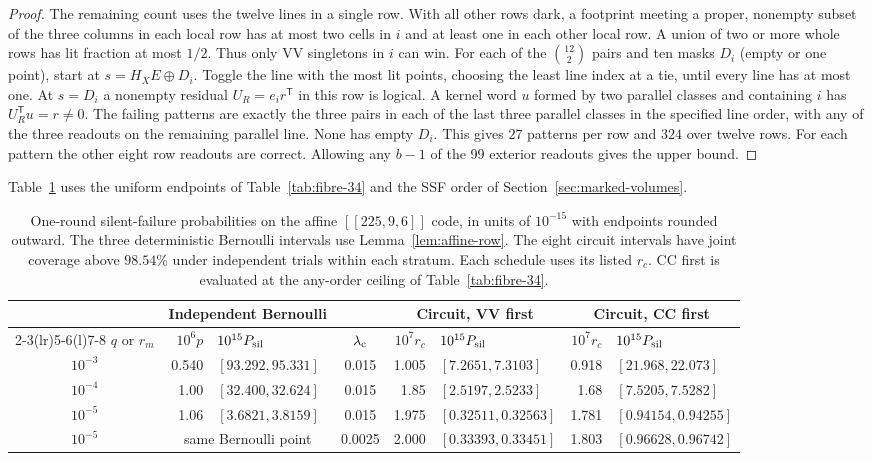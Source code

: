 \documentclass[10pt,twocolumn]{article}
\theoremstyle{definition}
\begin{document}
\begin{proof}
The remaining count uses the twelve lines in a single row. With all
other rows dark, a footprint meeting a proper, nonempty subset of
the three columns in each local row has at most two cells in $i$
and at least one in each other local row. A union of two or more
whole rows has lit fraction at most $1/2$. Thus only VV singletons
in $i$ can win. For each of the $\binom{12}{2}$ pairs and ten masks
$D_i$ (empty or one point), start at $s=H_XE\oplus D_i$.
Toggle the line with the most lit points, choosing the least line
index at a tie, until every line has at most one. At $s=D_i$ a
nonempty residual $U_R=e_i r^{\mathsf T}$ in this row is logical.
A kernel word $u$ formed by two parallel classes and containing $i$
has $U_R^{\mathsf T}u=r\ne0$. The failing patterns are exactly the
three pairs in each of the last three parallel classes in the specified
line order, with any of the three readouts on the remaining parallel
line. None has empty $D_i$. This gives $27$ patterns per row and $324$
over twelve rows. For each pattern the other eight row readouts
are correct. Allowing any $b-1$ of the 99 exterior readouts gives
the upper bound.
\end{proof}

Table~\ref{tab:affine225-pilot} uses the uniform endpoints of
Table~\ref{tab:fibre-34} and the SSF order of Section~\ref{sec:marked-volumes}.

\begin{table}[t]
\centering\normalsize
\setlength{\tabcolsep}{5pt}
\caption{One-round silent-failure probabilities on the affine
$[[225,9,6]]$ code, in units of $10^{-15}$ with endpoints rounded
outward. The three deterministic Bernoulli intervals use
Lemma~\ref{lem:affine-row}. The eight circuit intervals have joint
coverage above $98.54\%$ under independent trials within each stratum.
Each schedule uses its listed $r_c$. CC first is evaluated at the
any-order ceiling of Table~\ref{tab:fibre-34}.}
\label{tab:affine225-pilot}
\smallskip
\begin{tabular}{@{}crlcrlrl@{}}
\toprule
 & \multicolumn{2}{c}{Independent Bernoulli} &
 & \multicolumn{2}{c}{Circuit, VV first} & \multicolumn{2}{c}{Circuit, CC first}\\
\cmidrule(lr){2-3}\cmidrule(lr){5-6}\cmidrule(l){7-8}
$q$ or $r_m$ & $10^6p$ & $10^{15}P_{\rm sil}$ & $\lambda_{\rm c}$
 & $10^7r_c$ & $10^{15}P_{\rm sil}$ & $10^7r_c$ & $10^{15}P_{\rm sil}$\\
\midrule
$10^{-3}$ & 0.540 & $[93.292,95.331]$ & 0.015
 & 1.005 & $[7.2651,7.3103]$ & 0.918 & $[21.968,22.073]$\\
$10^{-4}$ & 1.00 & $[32.400,32.624]$ & 0.015
 & 1.85 & $[2.5197,2.5233]$ & 1.68 & $[7.5205,7.5282]$\\
$10^{-5}$ & 1.06 & $[3.6821,3.8159]$ & 0.015
 & 1.975 & $[0.32511,0.32563]$ & 1.781 & $[0.94154,0.94255]$\\
$10^{-5}$ & \multicolumn{2}{c}{same Bernoulli point} & 0.0025
 & 2.000 & $[0.33393,0.33451]$ & 1.803 & $[0.96628,0.96742]$\\
\bottomrule
\end{tabular}
\end{table}
\end{document}
